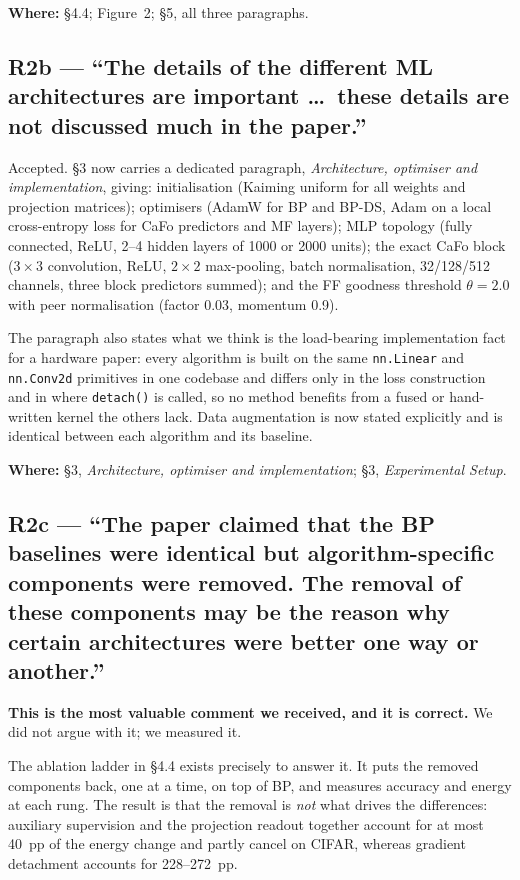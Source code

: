 \documentclass[11pt,a4paper]{article}
\newcommand{\FF}{FF}
\newcommand{\MF}{MF}
\newcommand{\BP}{BP}
\newcommand{\CaFo}{CaFo}
\newcommand{\BPDS}{BP-DS}
\newcommand{\where}[1]{\par\smallskip\noindent\textbf{Where:} #1\par}
\begin{document}
\where{\S4.4; Figure~2; \S5, all three paragraphs.}

\subsection*{R2b --- ``The details of the different ML architectures are
important \dots\ these details are not discussed much in the paper.''}

Accepted. \S3 now carries a dedicated paragraph, \emph{Architecture, optimiser
and implementation}, giving: initialisation (Kaiming uniform for all weights
and projection matrices); optimisers (AdamW for \BP{} and \BPDS{}, Adam on a
local cross-entropy loss for \CaFo{} predictors and \MF{} layers); MLP
topology (fully connected, ReLU, \numrange{2}{4} hidden layers of \num{1000}
or \num{2000} units); the exact \CaFo{} block ($3{\times}3$ convolution, ReLU,
$2{\times}2$ max-pooling, batch normalisation, \num{32}/\num{128}/\num{512}
channels, three block predictors summed); and the \FF{} goodness threshold
$\theta=2.0$ with peer normalisation (factor \num{0.03}, momentum \num{0.9}).

The paragraph also states what we think is the load-bearing implementation
fact for a hardware paper: every algorithm is built on the same
\texttt{nn.Linear} and \texttt{nn.Conv2d} primitives in one codebase and
differs only in the loss construction and in where \texttt{detach()} is
called, so no method benefits from a fused or hand-written kernel the others
lack. Data augmentation is now stated explicitly and is identical between each
algorithm and its baseline.

\where{\S3, \emph{Architecture, optimiser and implementation}; \S3,
\emph{Experimental Setup}.}

\subsection*{R2c --- ``The paper claimed that the BP baselines were identical
but algorithm-specific components were removed. The removal of these
components may be the reason why certain architectures were better one way or
another.''}

\textbf{This is the most valuable comment we received, and it is correct.} We
did not argue with it; we measured it.

The ablation ladder in \S4.4 exists precisely to answer it. It puts the
removed components back, one at a time, on top of \BP{}, and measures accuracy
and energy at each rung. The result is that the removal is \emph{not} what
drives the differences: auxiliary supervision and the projection readout
together account for at most \num{40}~pp of the energy change and partly
cancel on CIFAR, whereas gradient detachment accounts for
\numrange{228}{272}~pp.
\end{document}

